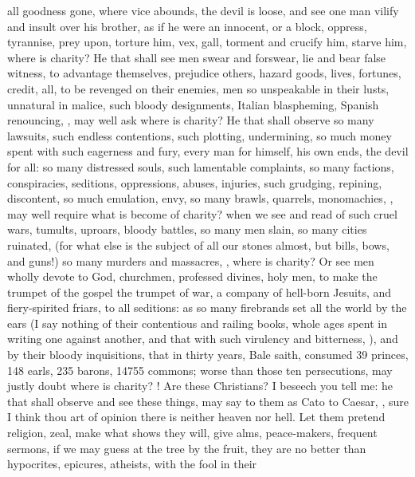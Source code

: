 {all goodness gone, where vice abounds, the devil is loose, and see one
man vilify and insult over his brother, as if he were an innocent, or a
block, oppress, tyrannise, prey upon, torture him, vex, gall, torment
and crucify him, starve him, where is charity? He that shall see men
swear and forswear, lie and bear false witness, to advantage
themselves, prejudice others, hazard goods, lives, fortunes, credit,
all, to be revenged on their enemies, men so unspeakable in their
lusts, unnatural in malice, such bloody designments, Italian
blaspheming, Spanish renouncing, \etc{}, may well ask where is charity? He
that shall observe so many lawsuits, such endless contentions, such
plotting, undermining, so much money spent with such eagerness and
fury, every man for himself, his own ends, the devil for all: so many
distressed souls, such lamentable complaints, so many factions,
conspiracies, seditions, oppressions, abuses, injuries, such grudging,
repining, discontent, so much emulation, envy, so many brawls,
quarrels, monomachies, \etc{}, may well require what is become of charity?
when we see and read of such cruel wars, tumults, uproars, bloody
battles, so many men slain, so many cities ruinated, \etc{} (for
what else is the subject of all our stones almost, but bills, bows, and
guns!) so many murders and massacres, \etc{}, where is charity? Or see men
wholly devote to God, churchmen, professed divines, holy men, to
make the trumpet of the gospel the trumpet of war, a company of
hell-born Jesuits, and fiery-spirited friars,  to all
seditions: as so many firebrands set all the world by the ears (I say
nothing of their contentious and railing books, whole ages spent in
writing one against another, and that with such virulency and
bitterness, ), and by their bloody
inquisitions, that in thirty years, Bale saith, consumed 39 princes,
148 earls, 235 barons, 14\thinspace{}755 commons; worse than those ten
persecutions, may justly doubt where is charity? ! Are these Christians? I beseech you tell me: he that
shall observe and see these things, may say to them as Cato to Caesar,
, sure I think thou art
of opinion there is neither heaven nor hell. Let them pretend religion,
zeal, make what shows they will, give alms, peace-makers, frequent
sermons, if we may guess at the tree by the fruit, they are no better
than hypocrites, epicures, atheists, with the fool in their
}
